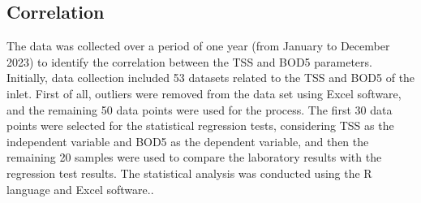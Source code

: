 \subsection{Correlation}
The data was collected over a period of one year (from January to December 2023) to identify the correlation between the \ac{TSS} and \ac{BOD5} parameters. Initially, data collection included 53 datasets related to the \ac{TSS} and \ac{BOD5} of the inlet. First of all, outliers were removed from the data set using Excel software, and the remaining 50 data points were used for the process. The first 30 data points were selected for the statistical regression tests, considering \ac{TSS} as the independent variable and \ac{BOD5} as the dependent variable, and then the remaining 20 samples were used to compare the laboratory results with the regression test results. The statistical analysis was conducted using the R language and Excel software.\cite{Kumar2010, Nikoonahad2016}.

 